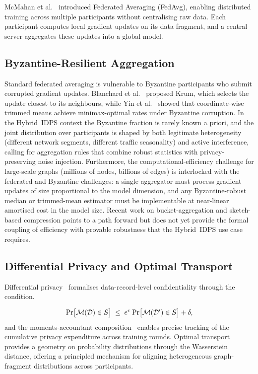 McMahan et al.~\cite{McMahan2017} introduced Federated Averaging (FedAvg), enabling distributed training across multiple participants without centralising raw data. Each participant computes local gradient updates on its data fragment, and a central server aggregates these updates into a global model.

\subsection{Byzantine-Resilient Aggregation}

Standard federated averaging is vulnerable to Byzantine participants who submit corrupted gradient updates. Blanchard et al.~\cite{Blanchard2017} proposed Krum, which selects the update closest to its neighbours, while Yin et al.~\cite{Yin2018} showed that coordinate-wise trimmed means achieve minimax-optimal rates under Byzantine corruption. In the Hybrid~IDPS context the Byzantine fraction is rarely known a priori, and the joint distribution over participants is shaped by both legitimate heterogeneity (different network segments, different traffic seasonality) and active interference, calling for aggregation rules that combine robust statistics with privacy-preserving noise injection. Furthermore, the computational-efficiency challenge for large-scale graphs (millions of nodes, billions of edges) is interlocked with the federated and Byzantine challenges: a single aggregator must process gradient updates of size proportional to the model dimension, and any Byzantine-robust median or trimmed-mean estimator must be implementable at near-linear amortised cost in the model size. Recent work on bucket-aggregation and sketch-based compression points to a path forward but does not yet provide the formal coupling of efficiency with provable robustness that the Hybrid~IDPS use case requires.

\subsection{Differential Privacy and Optimal Transport}

Differential privacy~\cite{Dwork2006} formalises data-record-level confidentiality through the condition.

\begin{equation}
\mathrm{Pr}\bigl[\mathcal{M}(\mathcal{D})\in S\bigr]
\;\le\;
e^{\epsilon}\;\mathrm{Pr}\bigl[\mathcal{M}(\mathcal{D}')\in S\bigr] + \delta,
\end{equation}and the moments-accountant composition~\cite{Abadi2016} enables precise tracking of the cumulative privacy expenditure across training rounds. Optimal transport~\cite{Villani2009,Cuturi2013} provides a geometry on probability distributions through the Wasserstein distance, offering a principled mechanism for aligning heterogeneous graph-fragment distributions across participants.

